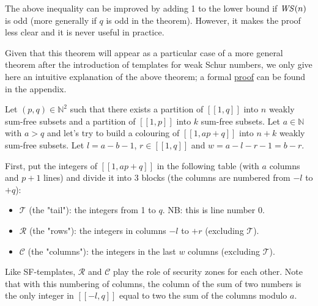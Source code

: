 \begin{remark}
The above inequality can be improved by adding 1 to the lower bound if \(\mathit{WS} (n)\) is odd (more generally if \(q\) is
odd in the theorem). However, it makes the proof less clear and it is never useful in practice.
\end{remark}

Given that this theorem will appear as a particular case of a more general theorem after the introduction of
templates for weak Schur numbers, we only give here an intuitive explanation of the above theorem; a formal
\hyperref[proof_theorem]{proof} can be found in the appendix.

Let \((p, q) \in \mathbb{N}^2\) such that there exists a partition of \([\![1,q]\!]\) into \(n\) weakly sum-free
subsets and a partition of \([\![1,p]\!]\) into \(k\) sum-free subsets. Let \(a \in \mathbb{N}\) with \(a > q\)
and let's try to build a colouring of \([\![1, ap + q]\!]\) into \(n + k\) weakly sum-free subsets. Let
\(l = a - b - 1\), \(r \in [\![1,q]\!]\) and \(w = a - l - r - 1 = b - r\).

First, put the integers of \([\![1, ap + q]\!]\) in the following table (with \(a\) columns and \(p + 1\) lines) and divide it into 3 blocks (the columns are numbered from \(-l\) to \(+q\)):

\begin{itemize}
	\item \(\mathcal{T}\) (the "tail"): the integers from 1 to \(q\). NB: this is line number 0.
	\item \(\mathcal{R}\) (the "rows"): the integers in columns \(-l\) to \(+r\) (excluding  \(\mathcal{T}\)).
	\item \(\mathcal{C}\) (the "columns"): the integers in the last \(w\) columns (excluding  \(\mathcal{T}\)).
\end{itemize}

Like SF-templates, \(\mathcal{R}\) and \(\mathcal{C}\) play the role of security zones for each other. Note that with
this numbering of columns, the column of the sum of two numbers is the only integer in \([\![-l,q]\!]\) equal to two the
sum of the columns modulo \(a\).

